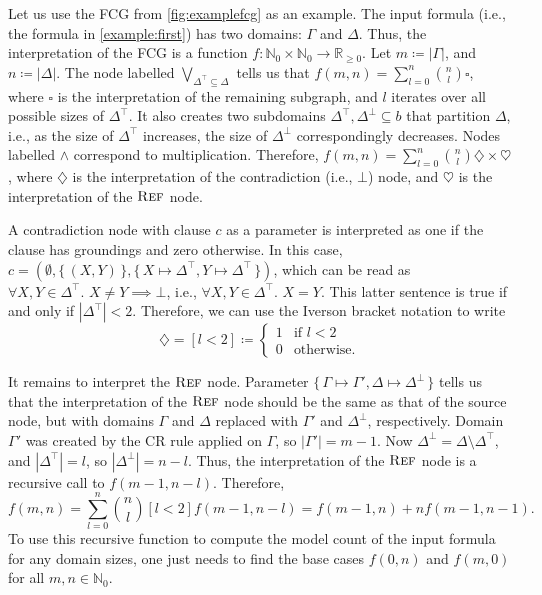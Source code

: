 \begin{example}\label{example:interpretation}
  Let us use the FCG from \cref{fig:examplefcg} as an example. The input formula
  (i.e., the formula in \cref{example:first}) has two domains: $\Gamma$ and
  $\Delta$. Thus, the interpretation of the FCG is a function
  $f\colon \mathbb{N}_{0} \times \mathbb{N}_{0} \to \mathbb{R}_{\ge 0}$. Let
  $m \coloneqq |\Gamma|$, and $n \coloneqq |\Delta|$. The node labelled
  $\bigvee_{\Delta^{\top} \subseteq \Delta}$ tells us that
  $f(m, n) = \sum_{l = 0}^{n} \binom{n}{l} \square$, where $\square$ is the
  interpretation of the remaining subgraph, and $l$ iterates over all possible
  sizes of $\Delta^{\top}$. It also creates two subdomains
  $\Delta^{\top}, \Delta^{\bot} \subseteq b$ that partition $\Delta$, i.e., as
  the size of $\Delta^{\top}$ increases, the size of $\Delta^{\bot}$
  correspondingly decreases. Nodes labelled $\land$ correspond to
  multiplication. Therefore,
  $f(m, n) = \sum_{l = 0}^{n} \binom{n}{l} \diamondsuit \times \heartsuit$,
  where $\diamondsuit$ is the interpretation of the contradiction (i.e., $\bot$)
  node, and $\heartsuit$ is the interpretation of the $\operatorname{\textsc{Ref}}$ node.

  A contradiction node with clause $c$ as a parameter is interpreted as one if
  the clause has groundings and zero otherwise. In this case,
  $c = (\emptyset, \{\, (X, Y) \,\}, \{\, X \mapsto \Delta^\top, Y \mapsto \Delta^\top \,\})$,
  which can be read as $\forall X, Y \in \Delta^{\top}\text{. }X \ne Y \implies \bot$, i.e., $\forall X, Y \in \Delta^{\top}\text{. }X = Y$. This
  latter sentence is true if and only if $|\Delta^{\top}| < 2$. Therefore, we can use
  the Iverson bracket notation to write
  \[
    \diamondsuit = [l < 2] \coloneqq
    \begin{cases}
      1 & \text{if } l < 2 \\
      0 & \text{otherwise.}
    \end{cases}
  \]

  It remains to interpret the $\operatorname{\textsc{Ref}}$ node. Parameter
  $\{\, \Gamma \mapsto \Gamma', \Delta \mapsto \Delta^\bot \,\}$ tells us that
  the interpretation of the $\operatorname{\textsc{Ref}}$ node should be the same as that of the
  source node, but with domains $\Gamma$ and $\Delta$ replaced with $\Gamma'$
  and $\Delta^{\bot}$, respectively. Domain $\Gamma'$ was created by the CR rule
  applied on $\Gamma$, so $|\Gamma'| = m - 1$. Now
  $\Delta^{\bot} = \Delta \setminus \Delta^{\top}$, and $|\Delta^{\top}| = l$,
  so $|\Delta^{\bot}| = n - l$. Thus, the interpretation of the $\operatorname{\textsc{Ref}}$ node is
  a recursive call to $f(m - 1, n - l)$. Therefore,
  \begin{equation}\label{eq:solution}
    f(m, n) = \sum_{l = 0}^{n} \binom{n}{l} [l < 2] f(m-1, n-l) = f(m-1, n) + n f(m-1, n-1).
  \end{equation}
  To use this recursive function to compute the model count of the input formula
  for any domain sizes, one just needs to find the base cases $f(0, n)$ and
  $f(m, 0)$ for all $m, n \in \mathbb{N}_{0}$.
\end{example}

